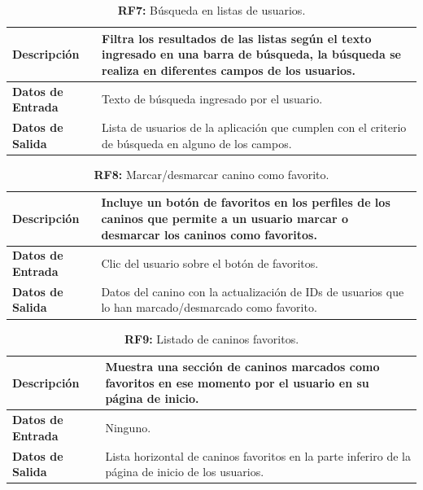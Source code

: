 \documentclass[a4paper, 12pt]{article}
\begin{document}
\begin{table}[H]
\captionsetup{list=no}%
\captionsetup{justification=raggedright,singlelinecheck=false}
\captionsetup{labelformat=empty}
\caption*{\textbf{RF7:} Búsqueda en listas de usuarios.}
\label{tab:RF7}
	\begin{tabular}{|m{5cm}|m{10cm}|}
\hline
	\textbf{Descripción} & Filtra los resultados de las listas según el texto ingresado en una barra de búsqueda, la búsqueda se realiza en diferentes campos de los usuarios. \\ 
	\hline
	\textbf{Datos de Entrada} & Texto de búsqueda ingresado por el usuario. \\ 
	\hline
	\textbf{Datos de Salida} &  Lista de usuarios de la aplicación que cumplen con el criterio de búsqueda en alguno de los campos. \\ 
	\hline
\end{tabular}
\end{table}

\begin{table}[H]
\captionsetup{list=no}%
\captionsetup{justification=raggedright,singlelinecheck=false}
\captionsetup{labelformat=empty}
\caption*{\textbf{RF8:} Marcar/desmarcar canino como favorito.}
\label{tab:RF8}
	\begin{tabular}{|m{5cm}|m{10cm}|}
	\hline
	\textbf{Descripción} & Incluye un botón de favoritos en los perfiles de los caninos que permite a un usuario marcar o desmarcar los caninos como favoritos. \\ 
	\hline
	\textbf{Datos de Entrada} & Clic del usuario sobre el botón de favoritos. \\ 
	\hline
	\textbf{Datos de Salida} & Datos del canino con la actualización de IDs de usuarios que lo han marcado/desmarcado como favorito.\\ 
	\hline
\end{tabular}
\end{table}

\begin{table}[H]
\captionsetup{list=no}%
\captionsetup{justification=raggedright,singlelinecheck=false}
\captionsetup{labelformat=empty}
\caption*{\textbf{RF9:} Listado de caninos favoritos.}
\label{tab:RF9}
	\begin{tabular}{|m{5cm}|m{10cm}|}
	\hline
	\textbf{Descripción} & Muestra una sección de caninos marcados como favoritos en ese momento por el usuario en su página de inicio. \\ 
	\hline
	\textbf{Datos de Entrada} & Ninguno. \\ 
	\hline
	\textbf{Datos de Salida} & Lista horizontal de caninos favoritos en la parte inferiro de la página de inicio de los usuarios. \\ 
	\hline
\end{tabular}
\end{table}
\end{document}
